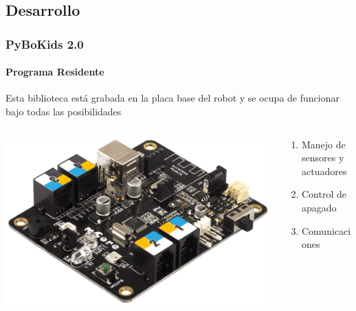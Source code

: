 \documentclass{beamer}
\begin{document}
\subsection{Desarrollo}
\begin{frame}
	\frametitle{PyBoKids 2.0}
	\framesubtitle{Programa Residente}
	Esta biblioteca está grabada en la placa base del robot y se ocupa de funcionar bajo todas las posibilidades
	\vspace{1cm}
	\begin{columns}
		\begin{column}{0.5\textwidth}
			\includegraphics[width=0.7\columnwidth]{mcore.png}
		\end{column}
		\begin{column}{0.5\textwidth}
			\begin{enumerate}
				\item Manejo de sensores y actuadores
				\item Control de apagado
				\item Comunicaciones
			\end{enumerate}
		\end{column}		
	\end{columns}
\end{frame}
\end{document}
